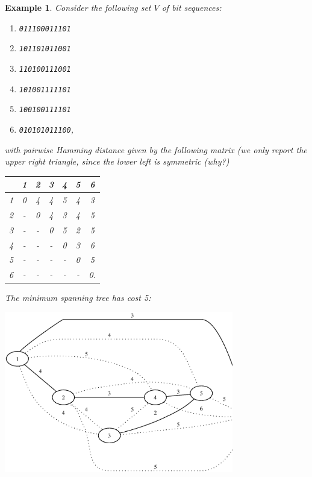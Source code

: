 \documentclass[a4paper]{book}
\theoremstyle{changebreak}                %
\newtheorem{eg}[result]{Example}
\begin{document}
\begin{eg}
Consider the following set $V$ of bit sequences:
\begin{center}
\begin{enumerate}
\item {\tt 011100011101}
\item {\tt 101101011001}
\item {\tt 110100111001}
\item {\tt 101001111101}
\item {\tt 100100111101}
\item {\tt 010101011100},
\end{enumerate}
\end{center}
with pairwise Hamming distance given by the following matrix (we only
report the upper right triangle, since the lower left is symmetric
(why?)
\begin{center}
\begin{tabular}{c|cccccc}
  & 1 & 2 & 3 & 4 & 5 & 6 \\ \hline
1 & 0 & 4 & 4 & 5 & 4 & 3 \\
2 & - & 0 & 4 & 3 & 4 & 5 \\
3 & - & - & 0 & 5 & 2 & 5 \\
4 & - & - & - & 0 & 3 & 6 \\
5 & - & - & - & - & 0 & 5 \\
6 & - & - & - & - & - & 0. 
\end{tabular}
\end{center}
The minimum spanning tree has cost 5:
\begin{center}
\includegraphics[width=10cm]{distnetsptree}
\end{center}
\end{eg}


\end{document}
